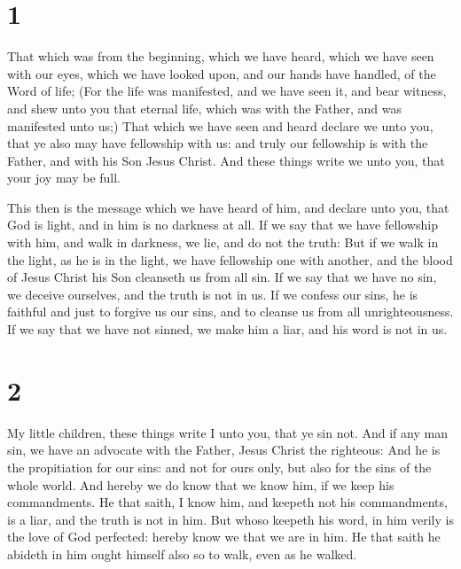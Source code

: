\hypertarget{section}{%
\section{1}\label{section}}

 That which was from the beginning, which we have heard,
which we have seen with our eyes, which we have looked upon, and our
hands have handled, of the Word of life;  (For the life
was manifested, and we have seen it, and bear witness, and shew unto you
that eternal life, which was with the Father, and was manifested unto
us;)  That which we have seen and heard declare we unto
you, that ye also may have fellowship with us: and truly our fellowship
is with the Father, and with his Son Jesus Christ.  And
these things write we unto you, that your joy may be full.

 This then is the message which we have heard of him, and
declare unto you, that God is light, and in him is no darkness at all.
 If we say that we have fellowship with him, and walk in
darkness, we lie, and do not the truth:  But if we walk in
the light, as he is in the light, we have fellowship one with another,
and the blood of Jesus Christ his Son cleanseth us from all sin.
 If we say that we have no sin, we deceive ourselves, and
the truth is not in us.  If we confess our sins, he is
faithful and just to forgive us our sins, and to cleanse us from all
unrighteousness.  If we say that we have not sinned, we
make him a liar, and his word is not in us.

\hypertarget{section-1}{%
\section{2}\label{section-1}}

 My little children, these things write I unto you, that
ye sin not. And if any man sin, we have an advocate with the Father,
Jesus Christ the righteous:  And he is the propitiation
for our sins: and not for ours only, but also for the sins of the whole
world.  And hereby we do know that we know him, if we keep
his commandments.  He that saith, I know him, and keepeth
not his commandments, is a liar, and the truth is not in him.
 But whoso keepeth his word, in him verily is the love of
God perfected: hereby know we that we are in him.  He that
saith he abideth in him ought himself also so to walk, even as he
walked.

